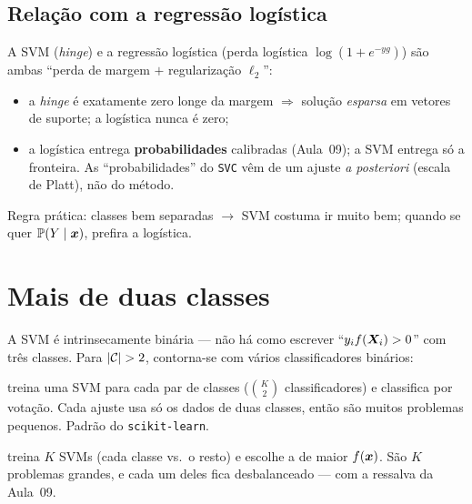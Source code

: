 \documentclass[11pt,a4paper]{article}
\begin{document}
\subsection{Relação com a regressão logística}
A SVM (\emph{hinge}) e a regressão logística (perda logística
$\log(1+e^{-yg})$) são ambas ``perda de margem $+$ regularização $\ell_2$'':
\begin{itemize}[leftmargin=1.4cm,nosep]
  \item a \emph{hinge} é exatamente zero longe da margem $\Rightarrow$ solução
        \emph{esparsa} em vetores de suporte; a logística nunca é zero;
  \item a logística entrega \textbf{probabilidades} calibradas (Aula~09); a SVM
        entrega só a fronteira. As ``probabilidades'' do \texttt{SVC} vêm de um
        ajuste \emph{a posteriori} (escala de Platt), não do método.
\end{itemize}
Regra prática: classes bem separadas $\to$ SVM costuma ir muito bem; quando se quer
$\mathbb{P}(Y\mid\bm{x})$, prefira a logística.

\section{Mais de duas classes}
A SVM é intrinsecamente binária --- não há como escrever ``$y_i f(\bm{X}_i)>0$'' com
três classes. Para $\left\lvert \mathcal{C} \right\rvert>2$, contorna-se com vários classificadores
binários:
\begin{description}[leftmargin=2.8cm,style=nextline]
  \item[Um-contra-um (OvO)] treina uma SVM para cada par de classes
        ($\binom{K}{2}$ classificadores) e classifica por votação. Cada ajuste usa
        só os dados de duas classes, então são muitos problemas pequenos. Padrão do
        \texttt{scikit-learn}.
  \item[Um-contra-todos (OvA)] treina $K$ SVMs (cada classe vs.\ o resto) e escolhe
        a de maior $f(\bm{x})$. São $K$ problemas grandes, e cada um deles fica
        desbalanceado --- com a ressalva da Aula~09.
\end{description}

\end{document}
